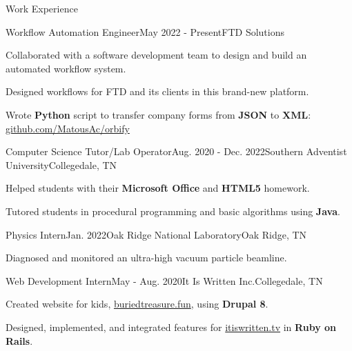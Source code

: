 \begin{rSection}{Work Experience}
	\begin{job}{Workflow Automation Engineer}{May 2022 - Present}{FTD Solutions}{}
		\item Collaborated with a software development team to design and build an automated workflow system.
		\item Designed workflows for FTD and its clients in this brand-new platform.
		\item Wrote {\bf Python} script to transfer company forms from {\bf JSON} to {\bf XML}: \href{https://github.com/MatousAc/orbify}{github.com/MatousAc/orbify}
	\end{job}
	
	\begin{job}{Computer Science Tutor/Lab Operator}{Aug. 2020 - Dec. 2022}{Southern Adventist University}{Collegedale, TN}{}
   \item Helped students with their {\bf Microsoft Office} and {\bf HTML5} homework. 
	 \item Tutored students in procedural programming and basic algorithms using {\bf Java}.
	\end{job}

	\begin{job}{Physics Intern}{Jan. 2022}{Oak Ridge National Laboratory}{Oak Ridge, TN}
	 \item Diagnosed and monitored an ultra-high vacuum particle beamline.
	\end{job}

	\begin{job}{Web Development Intern}{May - Aug. 2020}{It Is Written Inc.}{Collegedale, TN}
		\item Created website for kids, \href{https://buriedtreasure.fun/}{buriedtreasure.fun}, using {\bf Drupal 8}.
		\item Designed, implemented, and integrated features for \href{https://itiswritten.tv}{itiswritten.tv} in {\bf Ruby on Rails}.
	\end{job}
\end{rSection}
